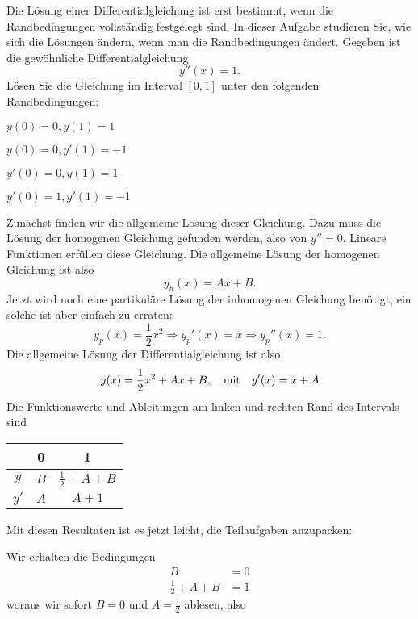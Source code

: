 Die Lösung einer Differentialgleichung ist erst bestimmt, wenn
die Randbedingungen vollständig festgelegt sind. In dieser Aufgabe
studieren Sie, wie sich die Lösungen ändern, wenn man die Randbedingungen
ändert. Gegeben ist die gewöhnliche Differentialgleichung
\[
y''(x)=1.
\]
Lösen Sie die Gleichung im Interval $[0,1]$
unter den folgenden Randbedingungen:
\begin{teilaufgaben}
\item $y(0)=0, y(1)=1$
\item $y(0)=0, y'(1)=-1$
\item $y'(0)=0, y(1)=1$
\item $y'(0)=1, y'(1)=-1$
\end{teilaufgaben}

\begin{loesung}
Zunächst finden wir die allgemeine Lösung dieser Gleichung.
Dazu muss die Lösung der homogenen Gleichung gefunden werden,
also von $y''=0$. Lineare Funktionen erfüllen diese Gleichung.
Die allgemeine Lösung der homogenen Gleichung ist also
\[
y_h(x)=Ax+B.
\]
Jetzt wird noch eine partikuläre Lösung der inhomogenen
Gleichung benötigt, ein solche ist aber einfach zu
erraten:
\[
y_p(x)=\frac12x^2\Rightarrow y_p'(x)=x\Rightarrow y_p''(x)=1.
\]
Die allgemeine Lösung der Differentialgleichung ist also
\[
y(x)=\frac12x^2+Ax+B, \text{\quad mit\quad} y'(x)=x+A
\]
Die Funktionswerte und Ableitungen am linken und rechten
Rand des Intervals sind
\begin{center}
\begin{tabular}{|c|cc|}
\hline
&0&1\\
\hline
$y$&$B$&$\frac12 +A+B$\\
$y'$&$A$&$A+1$\\
\hline
\end{tabular}
\end{center}
Mit diesen Resultaten ist es jetzt leicht, die Teilaufgaben anzupacken:
\begin{teilaufgaben}
\item Wir erhalten die Bedingungen
\begin{align*}
B&=0\\
\frac12+A+B&=1
\end{align*}
woraus wir sofort $B=0$ und $A=\frac12$ ablesen, also

\end{teilaufgaben}
\end{loesung}
